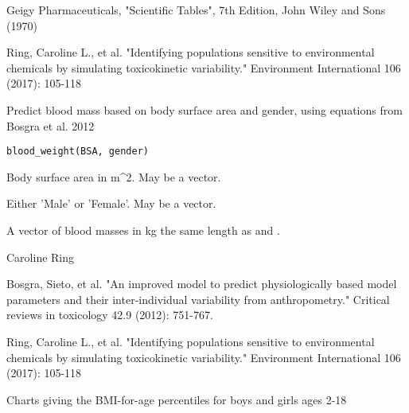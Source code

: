 \documentclass[a4paper]{book}
\begin{document}
%
\begin{References}\relax
Geigy Pharmaceuticals, "Scientific Tables", 7th Edition, 
John Wiley and Sons (1970)

Ring, Caroline L., et al. "Identifying populations sensitive to
environmental chemicals by simulating toxicokinetic variability."
Environment International 106 (2017): 105-118
\end{References}
%
\begin{Description}\relax
Predict blood mass based on body surface area and gender, using equations
from Bosgra et al. 2012
\end{Description}
%
\begin{Usage}
\begin{verbatim}
blood_weight(BSA, gender)
\end{verbatim}
\end{Usage}
%
\begin{Arguments}
\begin{ldescription}
\item[\code{BSA}] Body surface area in m\textasciicircum{}2. May be a vector.

\item[\code{gender}] Either 'Male' or 'Female'. May be a vector.
\end{ldescription}
\end{Arguments}
%
\begin{Value}
A vector of blood masses in kg the same length as  and
.
\end{Value}
%
\begin{Author}\relax
Caroline Ring
\end{Author}
%
\begin{References}\relax
Bosgra, Sieto, et al. "An improved model to predict 
physiologically based model parameters and their inter-individual variability 
from anthropometry." Critical reviews in toxicology 42.9 (2012): 751-767.

Ring, Caroline L., et al. "Identifying populations sensitive to
environmental chemicals by simulating toxicokinetic variability."
Environment International 106 (2017): 105-118
\end{References}
%
\begin{Description}\relax
Charts giving the BMI-for-age percentiles for boys and girls ages 2-18
\end{Description}
\end{document}
